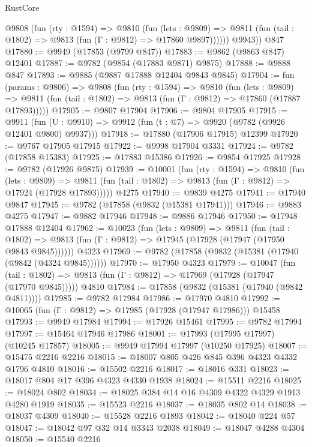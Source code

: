 \begin{lexlean}{RustCore}
\begin{coremodule}
          @9808
            (fun (rty : @1594) =>
            @9810
              (fun (lets : @9809) =>
              @9811 (fun (tail : @1802) => @9813 (fun (Γ : @9812) => @17860 @9897))))))
        @9943))
    @847
@17880 := @9949 (@17853 (@9799 @847))
@17883 := @9862 (@9863 @847) @12401
@17887 := @9782 (@9854 (@17883 @9871) @9875)
@17888 := @9888 @847
@17893 := @9885 (@9887 @17888 @12404 @9843 @9845)
@17904 := fun (params : @9806) =>
  @9808
    (fun (rty : @1594) =>
    @9810
      (fun (lets : @9809) =>
      @9811 (fun (tail : @1802) => @9813 (fun (Γ : @9812) => @17860 (@17887 @17893)))))
@17905 := @9807 @17904
@17906 := @9804 @17905
@17915 := @9911
    (fun (U : @9910) => @9912 (fun (t : @7) => @9920 (@9782 (@9926 @12401 @9800) @9937)))
@17918 := @17880 (@17906 @17915) @12399
@17920 := @9767 @17905 @17915
@17922 := @9998 @17904 @3331
@17924 := @9782 (@17858 @15383)
@17925 := @17883 @15386
@17926 := @9854 @17925
@17928 := @9782 (@17926 @9875)
@17939 := @10001
    (fun (rty : @1594) =>
    @9810
      (fun (lets : @9809) =>
      @9811 (fun (tail : @1802) => @9813 (fun (Γ : @9812) => @17924 (@17928 @17893)))))
    @4275
@17940 := @9839 @4275
@17941 := @17940 @9847
@17945 := @9782 (@17858 (@9832 (@15381 @17941)))
@17946 := @9883 @4275
@17947 := @9882 @17946
@17948 := @9886 @17946
@17950 := @17948 @17888 @12404
@17962 := @10023
    (fun (lets : @9809) =>
    @9811
      (fun (tail : @1802) =>
      @9813 (fun (Γ : @9812) => @17945 (@17928 (@17947 (@17950 @9843 @9845))))))
    @4323
@17969 := @9782 (@17858 (@9832 (@15381 (@17940 (@9842 (@4324 @9845))))))
@17970 := @17950 @4323
@17979 := @10047
    (fun (tail : @1802) => @9813 (fun (Γ : @9812) => @17969 (@17928 (@17947 (@17970 @9845)))))
    @4810
@17984 := @17858 (@9832 (@15381 (@17940 (@9842 @4811))))
@17985 := @9782 @17984
@17986 := @17970 @4810
@17992 := @10065 (fun (Γ : @9812) => @17985 (@17928 (@17947 @17986))) @15458
@17993 := @9949 @17984
@17994 := @17926 @15461
@17995 := @9782 @17994
@17997 := @15464 @17946 @17986
@18001 := @17993 (@17995 @17997) (@10245 @17857)
@18005 := @9949 @17994 @17997 (@10250 @17925)
@18007 := @15475 @2216 @2216
@18015 := @18007 @805 @426 @845 @396 @4323 @4332 @1796 @4810
@18016 := @15502 @2216
@18017 := @18016 @331
@18023 := @18017 @804 @17 @396 @4323 @4330 @1938
@18024 := @15511 @2216
@18025 := @18024 @802
@18034 := @18025 @384 @14 @16 @4309 @4322 @4329 @1913 @4280 @1919
@18035 := @15523 @2216
@18037 := @18035 @802 @14
@18038 := @18037 @4309
@18040 := @15528 @2216 @1893
@18042 := @18040 @224 @57
@18047 := @18042 @97 @32 @14 @3343 @2038
@18049 := @18047 @4288 @4304
@18050 := @15540 @2216

\end{coremodule}
\end{lexlean}
